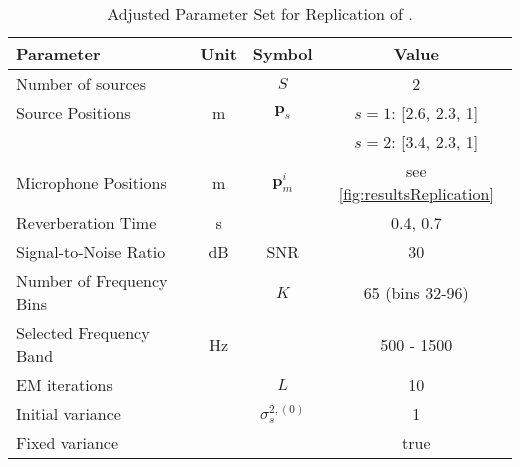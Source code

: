 \begin{table}[!htbp]
	\begin{tabular}{lccc}
		\toprule
		Parameter                                     & Unit & Symbol                 & Value                                       \\
		\midrule
		Number of sources                             &      & $S$                    & 2                                           \\
		Source Positions                              & m    & $\bm p_s$              & $s=1$: [2.6, 2.3, 1]                        \\
		                                              &      &                        & $s=2$: [3.4, 2.3, 1]                        \\
		Microphone Positions                          & m    & $\bm p_m^i$            & see \autoref{fig:resultsReplication} \\
		Reverberation Time                            & s    & \Tsixty                & 0.4, 0.7                                    \\
		Signal-to-Noise Ratio                         & dB   & SNR                    & 30                                          \\
		Number of \glsentryshort{stft} Frequency Bins &      & $K$                    & 65 (bins 32-96)                             \\
		Selected Frequency Band                       & Hz   &                        & 500 - 1500                                  \\
		EM iterations                                 &      & $L$                    & 10                                          \\
		Initial variance                              &      & $\sigma^{2, (0)}_s$ & 1                                           \\
		Fixed variance                                &      &                        & true                                       \\
		\bottomrule
	\end{tabular}
	\caption[Adjusted Parameters for Replication of \cite{Schwartz2014}]{Adjusted Parameter Set for Replication of \cite{Schwartz2014}.}
	\label{table:parametersSchwartz14}
\end{table}